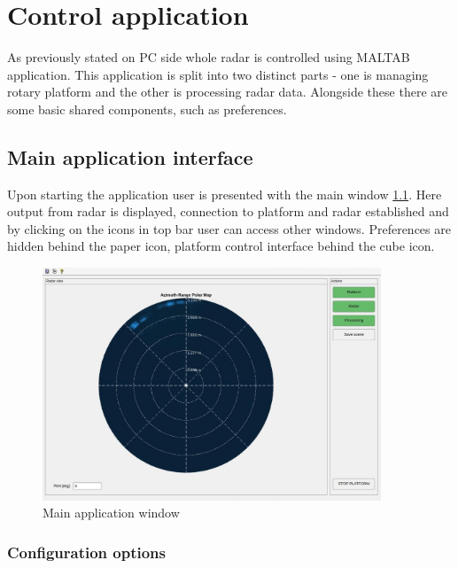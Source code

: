 \chapter{Control application}

As previously stated on PC side whole radar is controlled using MALTAB application.
This application is split into two distinct parts - one is managing rotary platform and the other is processing radar data.
Alongside these there are some basic shared components, such as preferences.

\section{Main application interface}

Upon starting the application user is presented with the main window \ref{fig:main_window}.
Here output from radar is displayed, connection to platform and radar established and by clicking on the icons in top bar user can access other windows.
Preferences are hidden behind the paper icon, platform control interface behind the cube icon.

\begin{figure}[h!]
  \centering
  \includegraphics[width=0.9\textwidth]{../img/vis_range_azimuth.jpg}
  \caption[Main application window]{Main application window}
  \label{fig:main_window}
\end{figure}

\subsection{Configuration options}

